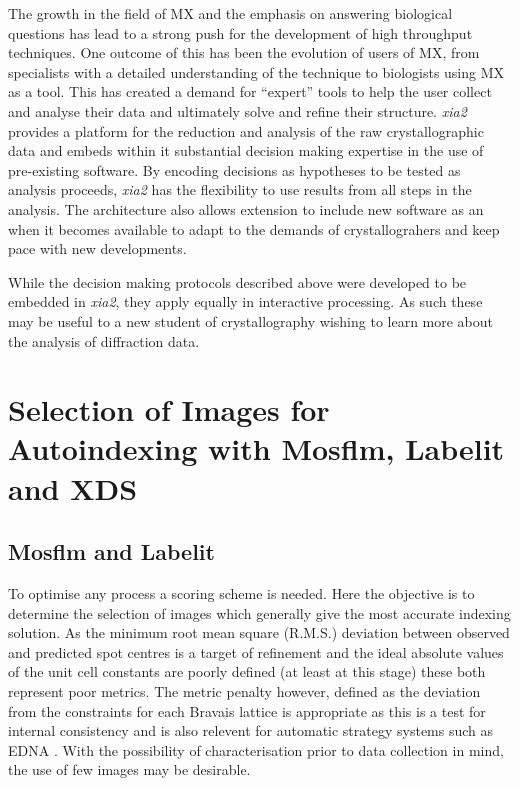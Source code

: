 \documentclass[a4paper, 11pt]{article}
\begin{document}
The growth in the field of MX and the emphasis on answering biological
questions has lead to a strong push for the development of high
throughput techniques. One outcome of this has been the evolution of
users of MX, from specialists with a detailed understanding of the
technique to biologists using MX as a tool. This has created a demand
for ``expert'' tools to help the user collect and analyse their data
and ultimately solve and refine their structure. \emph{xia2} provides
a platform for the reduction and analysis of the raw crystallographic
data and embeds within it substantial decision making expertise in the
use of pre-existing software. By encoding
decisions as hypotheses to be tested as analysis proceeds, \emph{xia2}
has the flexibility to use results from all steps in the analysis. The
architecture also allows extension to include new software as an when
it becomes available to adapt to the demands of crystallograhers and
keep pace with new developments.

While the decision making protocols described above were developed to
be embedded in \emph{xia2}, they apply equally in interactive
processing. As such these may be useful to a new student of
crystallography wishing to learn more about the analysis of
diffraction data.

\appendix

\section{Selection of Images for Autoindexing with Mosflm, Labelit and
XDS}

\subsection{Mosflm and Labelit}

To optimise any process a scoring scheme is needed. Here the objective
is to determine the selection of images which generally give the most
accurate indexing solution. As the minimum root mean square
(R.M.S.) deviation between observed
and predicted spot centres is a target of refinement and the ideal absolute
values of the unit cell constants are poorly defined (at least at this
stage) these both represent poor metrics. The metric penalty however,
defined as the deviation from the constraints for each Bravais lattice
\cite{Grosse-Kunstleve:sh5006} is appropriate as this is a test for
internal consistency 
and is also relevent for automatic strategy systems such as EDNA
\cite{Incardona:wa5014}. With the possibility of characterisation
prior to data collection in mind, the use of few images may be desirable.
\end{document}
